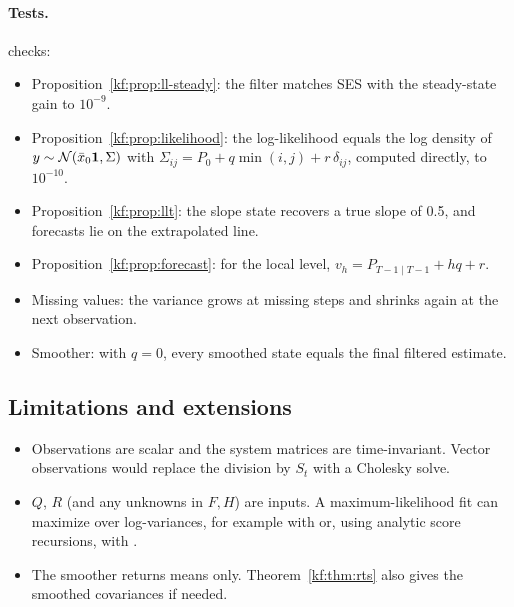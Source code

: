 \paragraph{Tests.}  checks:
\begin{itemize}
  \item Proposition~\ref{kf:prop:ll-steady}: the filter matches SES with the steady-state gain to $10^{-9}$.
  \item Proposition~\ref{kf:prop:likelihood}: the log-likelihood equals the log
        density of $y\sim\mathcal{N}(\bar x_0\mathbf1,\Sigma)$ with
        $\Sigma_{ij}=P_0+q\min(i,j)+r\,\delta_{ij}$, computed directly, to $10^{-10}$.
  \item Proposition~\ref{kf:prop:llt}: the slope state recovers a true slope of 0.5,
        and forecasts lie on the extrapolated line.
  \item Proposition~\ref{kf:prop:forecast}: for the local level, $v_h=P_{T-1\mid T-1}+hq+r$.
  \item Missing values: the variance grows at missing steps and shrinks again at the next observation.
  \item Smoother: with $q=0$, every smoothed state equals the final filtered estimate.
\end{itemize}

\subsection{Limitations and extensions}
\begin{itemize}
  \item Observations are scalar and the system matrices are time-invariant. Vector
        observations would replace the division by $S_t$ with a Cholesky solve.
  \item $Q$, $R$ (and any unknowns in $F,H$) are inputs. A maximum-likelihood fit
        can maximize  over log-variances, for example with
         or, using analytic score recursions, with .
  \item The smoother returns means only. Theorem~\ref{kf:thm:rts} also gives the
        smoothed covariances if needed.
\end{itemize}

